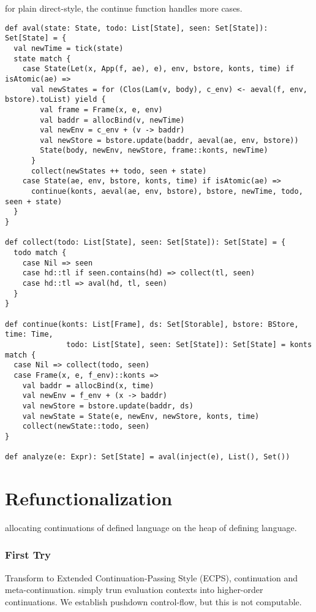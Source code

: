 \documentclass[acmsmall,review,anonymous]{acmart}\settopmatter{printfolios=true,printccs=false,printacmref=false}
\begin{document}
for plain direct-style, the continue function handles more cases.

\begin{lstlisting}
def aval(state: State, todo: List[State], seen: Set[State]): Set[State] = { 
  val newTime = tick(state)
  state match {
    case State(Let(x, App(f, ae), e), env, bstore, konts, time) if isAtomic(ae) =>
      val newStates = for (Clos(Lam(v, body), c_env) <- aeval(f, env, bstore).toList) yield {
        val frame = Frame(x, e, env)
        val baddr = allocBind(v, newTime)
        val newEnv = c_env + (v -> baddr)
        val newStore = bstore.update(baddr, aeval(ae, env, bstore))
        State(body, newEnv, newStore, frame::konts, newTime)
      }   
      collect(newStates ++ todo, seen + state)
    case State(ae, env, bstore, konts, time) if isAtomic(ae) =>
      continue(konts, aeval(ae, env, bstore), bstore, newTime, todo, seen + state)
  }   
}

def collect(todo: List[State], seen: Set[State]): Set[State] = { 
  todo match {
    case Nil => seen
    case hd::tl if seen.contains(hd) => collect(tl, seen)
    case hd::tl => aval(hd, tl, seen)
  }   
}

def continue(konts: List[Frame], ds: Set[Storable], bstore: BStore, time: Time,
              todo: List[State], seen: Set[State]): Set[State] = konts match {
  case Nil => collect(todo, seen)
  case Frame(x, e, f_env)::konts =>
    val baddr = allocBind(x, time)
    val newEnv = f_env + (x -> baddr)
    val newStore = bstore.update(baddr, ds) 
    val newState = State(e, newEnv, newStore, konts, time)
    collect(newState::todo, seen)
}

def analyze(e: Expr): Set[State] = aval(inject(e), List(), Set()) 
\end{lstlisting}

\section{Refunctionalization} \label{refunc}

allocating continuations of defined language on the heap of defining language.

\subsubsection{First Try}

Transform to Extended Continuation-Passing Style (ECPS), continuation and meta-continuation.
simply trun evaluation contexts into higher-order continuations.
We establish pushdown control-flow, but this is not computable.
\end{document}
